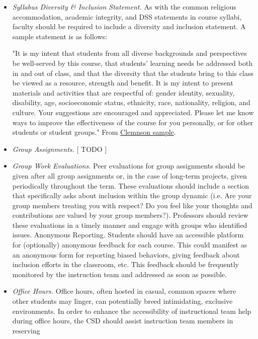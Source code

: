 \documentclass{article}
\begin{document}
\begin{itemize}
    \item
\emph{Syllabus Diversity \& Inclusion Statement.} 
As with the common religious accommodation, academic integrity, and DSS statements in course syllabi, 
faculty should be required to include a diversity and inclusion statement. 
A sample statement is as follows: 
\begin{center}
"It is my intent that students from all diverse backgrounds and perspectives be well-served by this course, 
that students' learning needs be addressed both in and out of class, and that the diversity that the students 
bring to this class be viewed as a resource, strength and benefit. It is my intent to present materials and 
activities that are respectful of: gender identity, sexuality, disability, age, socioeconomic status, ethnicity, 
race, nationality, religion, and culture. Your suggestions are encouraged and appreciated. Please let me know ways to 
improve the effectiveness of the course for you personally, or for other students or student groups."
From \href{https://www.clemson.edu/otei/documents/Teaching%20Review%20Resources/Diversity_InclusionSyllabiSamples.pdf}{Clemnson sample}.
\end{center}
\item
\emph{Group Assignments.} [ TODO ]
\item
\emph{Group Work Evaluations.} Peer evaluations for group assignments should be given after all group assignments 
or, in the case of long-term projects, given periodically throughout the term. These evaluations should include a 
section that specifically asks about inclusion within the group dynamic (i.e. Are your group members treating 
you with respect? Do you feel like your thoughts and contributions are valued by your group members?). Professors 
should review these evaluations in a timely manner and engage with groups who identified issues. 
Anonymous Reporting. Students should have an accessible platform for (optionally) anonymous feedback for each course. 
This could manifest as an anonymous form for reporting biased behaviors, giving feedback about inclusion efforts 
in the classroom, etc. This feedback should be frequently monitored by the instruction team and addressed as soon 
as possible. 
\item 
\emph{Office Hours.} 
Office hours, often hosted in casual, common spaces where other students may linger, 
can potentially breed intimidating, exclusive environments. In order to enhance the accessibility of 
instructional team help during office hours, the CSD should assist instruction team members in reserving 

\end{itemize}
\end{document}

